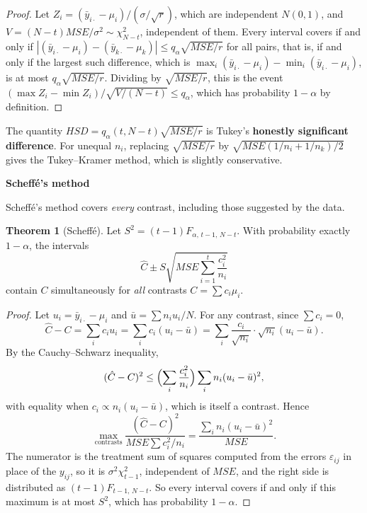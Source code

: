 \documentclass[11pt,a4paper]{article}
\numberwithin{equation}{section}
\theoremstyle{definition}
\newtheorem{thm}{Theorem}[subsection]
\newcommand{\subhead}[1]{%
  \par\medskip\noindent\textbf{#1}\par\nobreak\smallskip}
\begin{document}
\begin{proof}
Let $Z_i = (\bar y_{i\cdot} - \mu_i)/(\sigma/\sqrt r)$, which are independent $N(0, 1)$, and $V = (N - t)MSE/\sigma^2 \sim \chi^2_{N-t}$, independent of them. Every interval covers if and only
if $|(\bar y_{i\cdot} - \mu_i) - (\bar y_{k\cdot} - \mu_k)| \le q_\alpha\sqrt{MSE/r}$ for all pairs, that is, if and only if the largest such difference, which is
$\max_i(\bar y_{i\cdot} - \mu_i) - \min_i(\bar y_{i\cdot} - \mu_i)$, is at most $q_\alpha\sqrt{MSE/r}$. Dividing by $\sqrt{MSE/r}$, this is the event $(\max Z_i - \min Z_i)/\sqrt{V/(N - t)} \le q_\alpha$,
which has probability $1 - \alpha$ by definition.
\end{proof}

The quantity $HSD = q_\alpha(t, N - t)\sqrt{MSE/r}$ is Tukey's \textbf{honestly significant difference}. For unequal $n_i$, replacing $\sqrt{MSE/r}$ by
$\sqrt{MSE(1/n_i + 1/n_k)/2}$ gives the Tukey--Kramer method, which is slightly conservative.

\subhead{Scheff\'e's method}
Scheff\'e's method covers \emph{every} contrast, including those suggested by the data.

\begin{thm}[Scheff\'e]\label{thm:scheffe}
Let $S^2 = (t - 1)F_{\alpha,\,t-1,\,N-t}$. With probability exactly $1 - \alpha$, the intervals
\[
\hat C \pm S\sqrt{MSE\sum_{i=1}^t\frac{c_i^2}{n_i}}
\]
contain $C$ simultaneously for \emph{all} contrasts $C = \sum c_i\mu_i$.
\end{thm}

\begin{proof}
Let $u_i = \bar y_{i\cdot} - \mu_i$ and $\bar u = \sum n_iu_i/N$. For any contrast, since $\sum c_i = 0$,
\[
\hat C - C = \sum_ic_iu_i = \sum_ic_i(u_i - \bar u) = \sum_i\frac{c_i}{\sqrt{n_i}}\cdot\sqrt{n_i}(u_i - \bar u) .
\]
By the Cauchy--Schwarz inequality,
\[
(\hat C - C)^2 \le \Bigl(\sum_i\frac{c_i^2}{n_i}\Bigr)\sum_in_i(u_i - \bar u)^2 ,
\]
with equality when $c_i \propto n_i(u_i - \bar u)$, which is itself a contrast. Hence
\[
\max_{\text{contrasts}}\frac{(\hat C - C)^2}{MSE\sum c_i^2/n_i} = \frac{\sum_in_i(u_i - \bar u)^2}{MSE} .
\]
The numerator is the treatment sum of squares computed from the errors $\varepsilon_{ij}$ in place of the $y_{ij}$, so it is $\sigma^2\chi^2_{t-1}$, independent of $MSE$, and the
right side is distributed as $(t - 1)F_{t-1,\,N-t}$. So every interval covers if and only if this maximum is at most $S^2$, which has probability $1 - \alpha$.
\end{proof}
\end{document}
